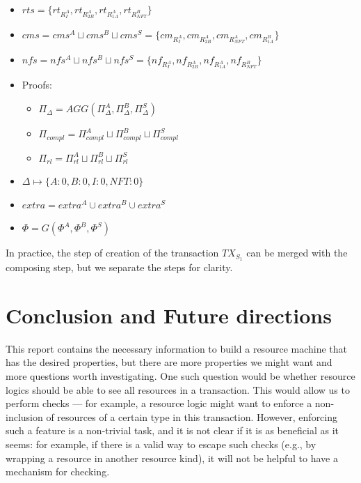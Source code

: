 \begin{itemize}
    \item $rts= \{rt_{R^A_{I}},
    rt_{R^A_{2B}},
    rt_{R^A_{1A}},  rt_{R^B_{NFT}}\}$
    \item $cms = cms^{A} \sqcup cms^B \sqcup cms^S = \{
    cm_{R^A_I}, cm_{R^A_{2B}}, cm_{R^A_{NFT}}, cm_{R^B_{1A}}\}$
    \item $nfs = nfs^A \sqcup nfs^B \sqcup nfs^S = \{nf_{R^A_{I}},
    nf_{R^A_{2B}},
    nf_{R^A_{1A}},  nf_{R^B_{NFT}}\}$
    \item Proofs:
    \begin{itemize}
        \item $\Pi_{\Delta} = AGG(\Pi^A_{\Delta}, \Pi^B_{\Delta}, \Pi^S_{\Delta})$
        \item $\Pi_{compl} = \Pi^A_{compl} \sqcup \Pi^B_{compl} \sqcup \Pi^S_{compl}$
        \item $\Pi_{rl} = \Pi^A_{rl} \sqcup \Pi^B_{rl} \sqcup \Pi^S_{rl}$
    \end{itemize}

    \item $\Delta \mapsto \{A: 0, B: 0, I: 0, NFT: 0\}$
    \item $extra = extra^A \cup extra^B \cup extra^S$
    \item $\Phi = G(\Phi^A, \Phi^B, \Phi^S)$
\end{itemize}

In practice, the step of creation of the transaction $TX_{S_1}$ can be merged with the composing step, but we separate the steps for clarity.

\section{Conclusion and Future directions}

This report contains the necessary information to build a resource machine that has the desired properties, but there are more properties we might want and more questions worth investigating. One such question would be whether resource logics should be able to see all resources in a transaction. This would allow us to perform  checks — for example, a resource logic might want to enforce a non-inclusion of resources of a certain type in this transaction. However, enforcing such a feature is a non-trivial task, and it is not clear if it is as beneficial as it seems: for example, if there is a valid way to escape such checks (e.g., by wrapping a resource in another resource kind), it will not be helpful to have a mechanism for checking. 

